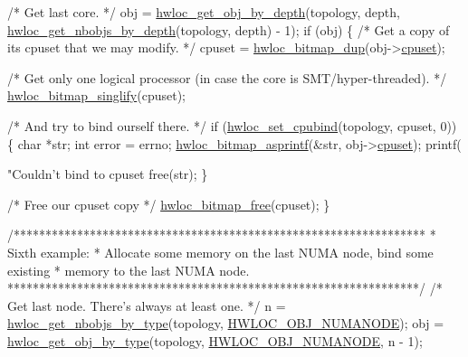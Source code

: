 \begin{DoxyCodeInclude}
{{{{{{{    \textcolor{comment}{/* Get last core. */}
    obj = \hyperlink{a00187_ga391f6b2613f0065673eaa4069b93d4e0}{hwloc\_get\_obj\_by\_depth}(topology, depth,
                   \hyperlink{a00187_ga1d5ceafe8130fe6e8657bf0bc666ba50}{hwloc\_get\_nbobjs\_by\_depth}(topology, depth) - 1);
    \textcolor{keywordflow}{if} (obj) \{
        \textcolor{comment}{/* Get a copy of its cpuset that we may modify. */}
        cpuset = \hyperlink{a00205_gae679434c1a5f41d3560a8a7e2c1b0dee}{hwloc\_bitmap\_dup}(obj->\hyperlink{a00238_a67925e0f2c47f50408fbdb9bddd0790f}{cpuset});

        \textcolor{comment}{/* Get only one logical processor (in case the core is}
\textcolor{comment}{           SMT/hyper-threaded). */}
        \hyperlink{a00205_gaa611a77c092e679246afdf9a60d5db8b}{hwloc\_bitmap\_singlify}(cpuset);

        \textcolor{comment}{/* And try to bind ourself there. */}
        \textcolor{keywordflow}{if} (\hyperlink{a00190_ga80bc07473a8edf840cae17bd7ec21d48}{hwloc\_set\_cpubind}(topology, cpuset, 0)) \{
            \textcolor{keywordtype}{char} *str;
            \textcolor{keywordtype}{int} error = errno;
            \hyperlink{a00205_ga0fece972134fdecf2da9bc7a11dd827e}{hwloc\_bitmap\_asprintf}(&str, obj->\hyperlink{a00238_a67925e0f2c47f50408fbdb9bddd0790f}{cpuset});
            printf(\textcolor{stringliteral}{"Couldn't bind to cpuset %
            free(str);
        \}

        \textcolor{comment}{/* Free our cpuset copy */}
        \hyperlink{a00205_ga156130d85b3a0674d6e0e6770fe68fbe}{hwloc\_bitmap\_free}(cpuset);
    \}

    \textcolor{comment}{/*****************************************************************}
\textcolor{comment}{     * Sixth example:}
\textcolor{comment}{     * Allocate some memory on the last NUMA node, bind some existing}
\textcolor{comment}{     * memory to the last NUMA node.}
\textcolor{comment}{     *****************************************************************/}
    \textcolor{comment}{/* Get last node. There's always at least one. */}
    n = \hyperlink{a00187_ga789a3f65aedff644be64a18526a03065}{hwloc\_get\_nbobjs\_by\_type}(topology, 
      \hyperlink{a00184_ggacd37bb612667dc437d66bfb175a8dc55a9d917a3e5497950c6d8948b8e183db5a}{HWLOC\_OBJ\_NUMANODE});
    obj = \hyperlink{a00187_ga6f414dd80a2b943967a0ac92da3181a2}{hwloc\_get\_obj\_by\_type}(topology, 
      \hyperlink{a00184_ggacd37bb612667dc437d66bfb175a8dc55a9d917a3e5497950c6d8948b8e183db5a}{HWLOC\_OBJ\_NUMANODE}, n - 1);

}}}}}}}}
\end{DoxyCodeInclude}
